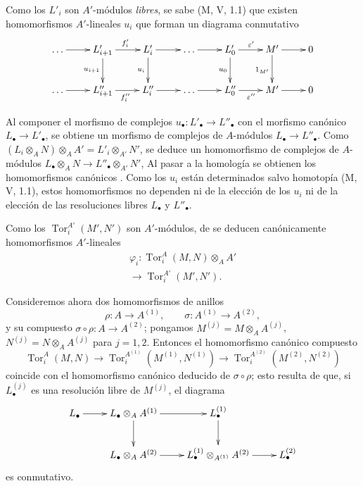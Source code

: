 
Como los $L'_i$ son $A'$-módulos \emph{libres}, se sabe (M, V, 1.1) que existen homomorfismos $A'$-lineales $u_i$ que forman un diagrama conmutativo
\[
\xymatrix{
\ldots\ar[r]&L'_{i+1}\ar[r]^{f'_i}\ar[d]_{u_{i+1}}&
L'_i\ar[r]\ar[d]_{u_i}&\ldots\ar[r]&
L'_0\ar[r]^{\varepsilon'}\ar[d]_{u_0}&M'\ar[r]\ar[d]_{1_{M'}}&0\\
\ldots\ar[r]&L''_{i+1}\ar[r]_{f''_i}&L''_i\ar[r]&\ldots\ar[r]&
L''_0\ar[r]_{\varepsilon''}&M'\ar[r]&0
}
\]

Al componer el morfismo de complejos
$u_\bullet:L'_\bullet\to L''_\bullet$ con el morfismo canónico
$L_\bullet\to L'_\bullet$, se obtiene un morfismo de
complejos de $A$-módulos
$L_\bullet\to L''_\bullet$. Como
$(L_i\otimes_AN)\otimes_AA'=L'_i\otimes_{A'}N'$,
se deduce un homomorfismo de complejos de $A$-módulos
$L_\bullet\otimes_AN\to L''_\bullet\otimes_{A'}N'$,
Al pasar a la homología se obtienen los homomorfismos canónicos
. Como los $u_i$ están determinados salvo
homotopía (M, V, 1.1), estos homomorfismos no dependen
ni de la elección de los $u_i$ ni de la elección de las resoluciones libres
$L_\bullet$ y $L''_\bullet$.

Como los $\operatorname{Tor}_i^{A'}(M',N')$ son $A'$-módulos, de  se deducen canónicamente homomorfismos $A'$-lineales
\begin{equation}
\begin{gathered}
\varphi_i:\operatorname{Tor}_i^A(M,N)\otimes_AA'\\[-2pt]
\longrightarrow\operatorname{Tor}_i^{A'}(M',N').
\end{gathered}
\label{IV.11.2.1.5-fr}
\tag{11.2.1.5}
\end{equation}

Consideremos ahora dos homomorfismos de anillos
\[
\rho:A\to A^{(1)},\qquad \sigma:A^{(1)}\to A^{(2)},
\]
y su compuesto $\sigma\circ\rho:A\to A^{(2)}$; pongamos $M^{(j)}=M\otimes_AA^{(j)}$, $N^{(j)}=N\otimes_AA^{(j)}$ para $j=1,2$. Entonces el homomorfismo canónico compuesto
\[
\operatorname{Tor}_i^A(M,N)\to
\operatorname{Tor}_i^{A^{(1)}}(M^{(1)},N^{(1)})\to
\operatorname{Tor}_i^{A^{(2)}}(M^{(2)},N^{(2)})
\]
coincide con el homomorfismo canónico deducido de $\sigma\circ\rho$; esto resulta de que, si $L_\bullet^{(j)}$ es una resolución libre de $M^{(j)}$, el diagrama
\[
\xymatrix{
L_\bullet\ar[r]&L_\bullet\otimes_AA^{(1)}\ar[r]\ar[d]&
L_\bullet^{(1)}\ar[d]\\
&L_\bullet\otimes_AA^{(2)}\ar[r]&
L_\bullet^{(1)}\otimes_{A^{(1)}}A^{(2)}\ar[r]&L_\bullet^{(2)}
}
\]
es conmutativo.

